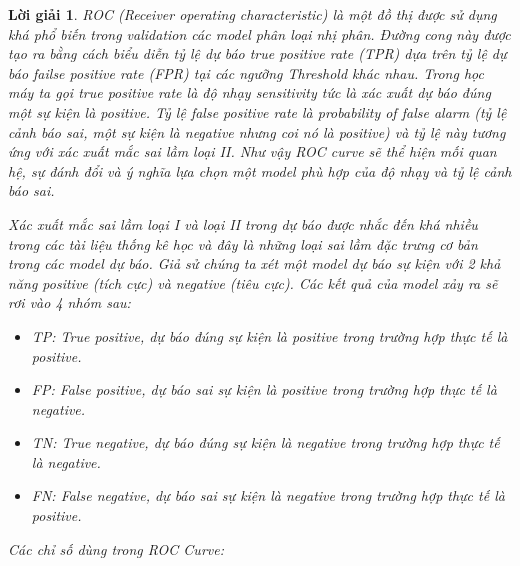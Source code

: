 \documentclass[14pt, a4paper]{article}
\theoremstyle{sltheorem}
\theoremstyle{soltheorem}
\newtheorem*{loigiai}{Lời giải}
\begin{document}
\begin{loigiai}
        
        ROC (Receiver operating characteristic) là một đồ thị được sử dụng khá phổ biến trong validation các model phân loại nhị phân. Đường cong này được tạo ra bằng cách biểu diễn tỷ lệ dự báo true positive rate (TPR) dựa trên tỷ lệ dự báo failse positive rate (FPR) tại các ngưỡng Threshold khác nhau. 
        Trong học máy ta gọi true positive rate là độ nhạy sensitivity tức là xác xuất dự báo đúng một sự kiện là positive. Tỷ lệ false positive rate là probability of false alarm (tỷ lệ cảnh báo sai, một sự kiện là negative nhưng coi nó là positive) và tỷ lệ này tương ứng với xác xuất mắc sai lầm loại II. Như vậy ROC curve sẽ thể hiện mối quan hệ, sự đánh đổi và ý nghĩa lựa chọn một model phù hợp của độ nhạy và tỷ lệ cảnh báo sai.

        Xác xuất mắc sai lầm loại I và loại II trong dự báo được nhắc đến khá nhiều trong các tài liệu thống kê học và đây là những loại sai lầm đặc trưng cơ bản trong các model dự báo. Giả sử chúng ta xét một model dự báo sự kiện với 2 khả năng positive (tích cực) và negative (tiêu cực). Các kết quả của model xảy ra sẽ rơi vào 4 nhóm sau:

        \begin{itemize}
            \item TP: True positive, dự báo đúng sự kiện là positive trong trường hợp thực tế là positive.
            \item FP: False positive, dự báo sai sự kiện là positive trong trường hợp thực tế là negative.
            \item TN: True negative, dự báo đúng sự kiện là negative trong trường hợp thực tế là negative.
            \item FN: False negative, dự báo sai sự kiện là negative trong trường hợp thực tế là positive.
        \end{itemize}

        Các chỉ số dùng trong ROC Curve:


\end{loigiai}
\end{document}
